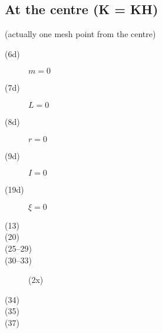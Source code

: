 \subsection{At the centre (K = KH)}

(actually one mesh point from the centre)

\begin{description}
\item[(6d)]    $m = 0$
\item[(7d)]    $L = 0$
\item[(8d)]    $r = 0$
\item[(9d)]    $I = 0$ 
\item[(19d)]   $\xi = 0$

\end{description}


\begin{description}
\item[(13)]  
\item[(20)]  
\item[(25--29)]  
\item[(30--33)]   (2x)
\item[(34)]  
\item[(35)]  
\item[(37)]  
\end{description}

